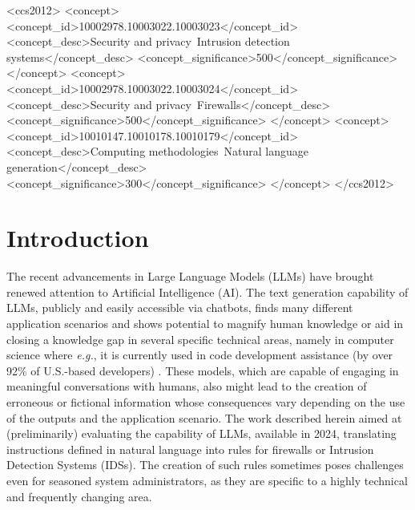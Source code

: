\documentclass[sigconf]{acmart}
\begin{document}
\begin{CCSXML}
<ccs2012>
   <concept>
       <concept_id>10002978.10003022.10003023</concept_id>
       <concept_desc>Security and privacy~Intrusion detection systems</concept_desc>
       <concept_significance>500</concept_significance>
   </concept>
   <concept>
       <concept_id>10002978.10003022.10003024</concept_id>
       <concept_desc>Security and privacy~Firewalls</concept_desc>
       <concept_significance>500</concept_significance>
   </concept>
   <concept>
       <concept_id>10010147.10010178.10010179</concept_id>
       <concept_desc>Computing methodologies~Natural language generation</concept_desc>
       <concept_significance>300</concept_significance>
   </concept>
 </ccs2012>
\end{CCSXML}



\maketitle

\section{Introduction}
The recent advancements in Large Language Models (LLMs) have brought renewed attention to Artificial Intelligence (AI). The text generation capability of LLMs, publicly and easily accessible via chatbots, finds many different application scenarios \cite{Kaddour23, Okonkwo21, Reis20} and shows potential to magnify human knowledge or aid in closing a knowledge gap in several specific technical areas, namely in computer science where \textit{e.g.}, it is currently used in code development assistance (by over 92\% of U.S.-based developers) \cite{Shani23}. These models, which are capable of engaging in meaningful conversations with humans, also might lead to the creation of erroneous or fictional information \cite{Chen23, Kabir23} whose consequences vary depending on the use of the outputs and the application scenario. The work described herein aimed at (preliminarily) evaluating the capability of LLMs, available in 2024, translating instructions defined in natural language into rules for firewalls or Intrusion Detection Systems (IDSs). The creation of such rules sometimes poses challenges even for seasoned system administrators, as they are specific to a highly technical and frequently changing area.
\end{document}
